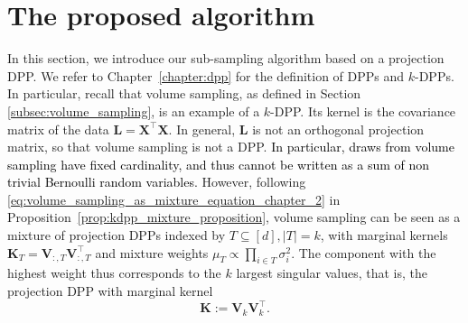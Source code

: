 \documentclass[twoside,11pt]{book}
\newcommand{\rev}[1]{\textcolor{black}{#1}}
\numberwithin{theorem}{chapter}
\numberwithin{definition}{chapter}
\numberwithin{proposition}{chapter}
\numberwithin{corollary}{chapter}
\numberwithin{example}{chapter}
\numberwithin{lemma}{chapter}
\numberwithin{assumption}{chapter}
\numberwithin{equation}{chapter}
\numberwithin{figure}{chapter}
\DeclareMathOperator{\Tran}{\intercal}
\begin{document}

\section{The proposed algorithm}
\label{s:dppsection}





In this section, we introduce our sub-sampling algorithm based on a projection DPP. We refer to Chapter~\ref{chapter:dpp} for the definition of DPPs and $k$-DPPs. In particular, recall that volume sampling, as defined in Section \ref{subsec:volume_sampling}, is an example of a $k$-DPP. Its kernel is the covariance matrix of the data $\bm{L} = \bm{X}^{\Tran}\bm{X}$.
In general, $\bm{L}$ is not an orthogonal projection matrix, so that volume sampling is not a DPP. \rev{In particular, draws from volume sampling have fixed cardinality, and thus cannot be written as a sum of non trivial Bernoulli random variables.}
However, following \eqref{eq:volume_sampling_as_mixture_equation_chapter_2} in  Proposition~\ref{prop:kdpp_mixture_proposition}, volume sampling can be seen as a mixture of projection DPPs indexed by $T\subseteq [d], \vert T\vert=k$, with marginal kernels $\bm{K}_{T} = \bm{V}^{}_{:,T}\bm{V}^{\Tran}_{:,T}$ and mixture weights $\mu_{T} \propto \prod_{i \in T} \sigma_{i}^{2}$. The component with the highest weight thus corresponds to the $k$ largest singular values, that is, the projection DPP with marginal kernel
\begin{equation}
\bm K:=\bm{V}^{}_{k}\bm{V}_{k}^{\Tran}.
\end{equation}
\end{document}
